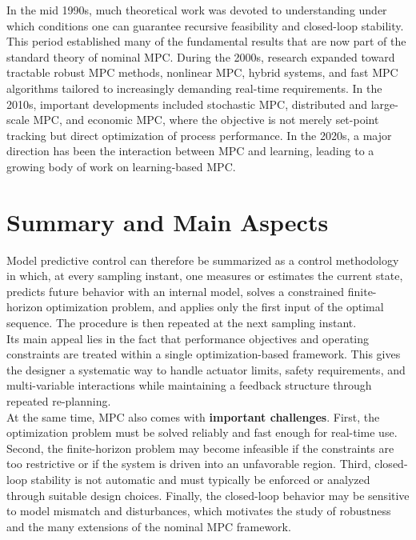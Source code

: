 In the mid 1990s, much theoretical work was devoted to understanding under which conditions one can guarantee recursive feasibility and closed-loop stability. This period established many of the fundamental results that are now part of the standard theory of nominal MPC. During the 2000s, research expanded toward tractable robust MPC methods, nonlinear MPC, hybrid systems, and fast MPC algorithms tailored to increasingly demanding real-time requirements. In the 2010s, important developments included stochastic MPC, distributed and large-scale MPC, and economic MPC, where the objective is not merely set-point tracking but direct optimization of process performance. In the 2020s, a major direction has been the interaction between MPC and learning, leading to a growing body of work on learning-based MPC.

\section{Summary and Main Aspects}

Model predictive control can therefore be summarized as a control methodology in which, at every sampling instant, one measures or estimates the current state, predicts future behavior with an internal model, solves a constrained finite-horizon optimization problem, and applies only the first input of the optimal sequence. The procedure is then repeated at the next sampling instant.\\

Its main appeal lies in the fact that performance objectives and operating constraints are treated within a single optimization-based framework. This gives the designer a systematic way to handle actuator limits, safety requirements, and multi-variable interactions while maintaining a feedback structure through repeated re-planning.\\
At the same time, MPC also comes with \textbf{important challenges}. First, the optimization problem must be solved reliably and fast enough for real-time use. Second, the finite-horizon problem may become infeasible if the constraints are too restrictive or if the system is driven into an unfavorable region. Third, closed-loop stability is not automatic and must typically be enforced or analyzed through suitable design choices. Finally, the closed-loop behavior may be sensitive to model mismatch and disturbances, which motivates the study of robustness and the many extensions of the nominal MPC framework.
